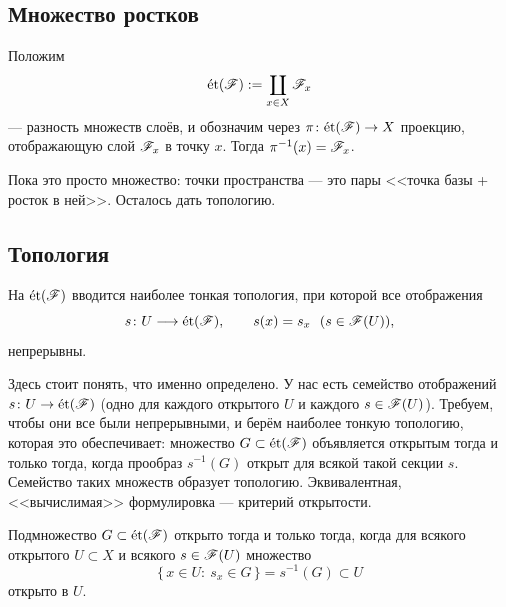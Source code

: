 
\subsection{Множество ростков}
\leavevmode\par
\begin{defn}
Положим
\begin{equation}\label{eq:etale-set}
 \et(\Shv{F}):=\coprod_{x\in X}\Shv{F}_x
\end{equation}
--- разность множеств слоёв, и обозначим через
$\pi\colon\et(\Shv{F})\to X$ проекцию, отображающую слой $\Shv{F}_x$
в точку $x$. Тогда $\pi^{-1}(x)=\Shv{F}_x$.
\end{defn}

Пока это просто множество: точки пространства --- это пары
<<точка базы + росток в ней>>. Осталось дать топологию.

\subsection{Топология}
\leavevmode\par
\begin{defn}
На $\et(\Shv{F})$ вводится наиболее тонкая топология, при которой все
отображения
\[
 s\colon U\longrightarrow\et(\Shv{F}),\qquad
 s(x)=s_x\ \ (s\in\Shv{F}(U)),
\]
непрерывны.
\end{defn}

Здесь стоит понять, что именно определено. У нас есть семейство
отображений $s\colon U\to\et(\Shv{F})$ (одно для каждого открытого $U$
и каждого $s\in\Shv{F}(U)$). Требуем, чтобы они все были непрерывными,
и берём наиболее тонкую топологию, которая это обеспечивает: множество
$G\subset\et(\Shv{F})$ объявляется открытым тогда и только тогда, когда
прообраз $s^{-1}(G)$ открыт для всякой такой секции $s$. Семейство таких
множеств образует топологию. Эквивалентная, <<вычислимая>> формулировка
--- критерий открытости.

\begin{thm}\label{thm:open}
Подмножество $G\subset\et(\Shv{F})$ открыто тогда и только тогда, когда
для всякого открытого $U\subset X$ и всякого $s\in\Shv{F}(U)$ множество
\begin{equation}\label{eq:crit}
 \{\,x\in U:\ s_x\in G\,\}=s^{-1}(G)\subset U
\end{equation}
открыто в $U$.
\end{thm}


